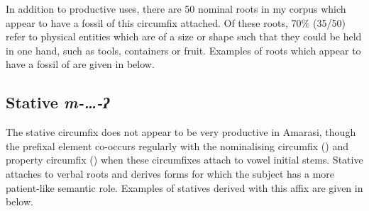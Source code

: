In addition to productive uses, there are 50 nominal roots
in my corpus which appear to have a fossil of this circumfix attached.
Of these roots, 70{\%} (35/50) refer to physical entities which are of a size or shape 
such that they could be held in one hand, such as tools, containers or fruit.
Examples of roots which appear to have a fossil of  are given in  below.

\begin{exe}
	\label{ex:RooFosNomCir}
\end{exe}

\subsection{Stative \it{m-{\ldots}-ʔ}}\label{sec:StaPre}
The stative circumfix  does not appear to be very productive in Amarasi,
though the prefixal element  co-occurs regularly with the nominalising circumfix
 () and property circumfix  ()
when these circumfixes attach to vowel initial stems.
Stative  attaches to verbal roots and derives forms for which
the subject has a more patient-like semantic role.
Examples of statives derived with this affix are given in  below.

\begin{exe}
	\label{ex:StaVerM-}
\end{exe}

